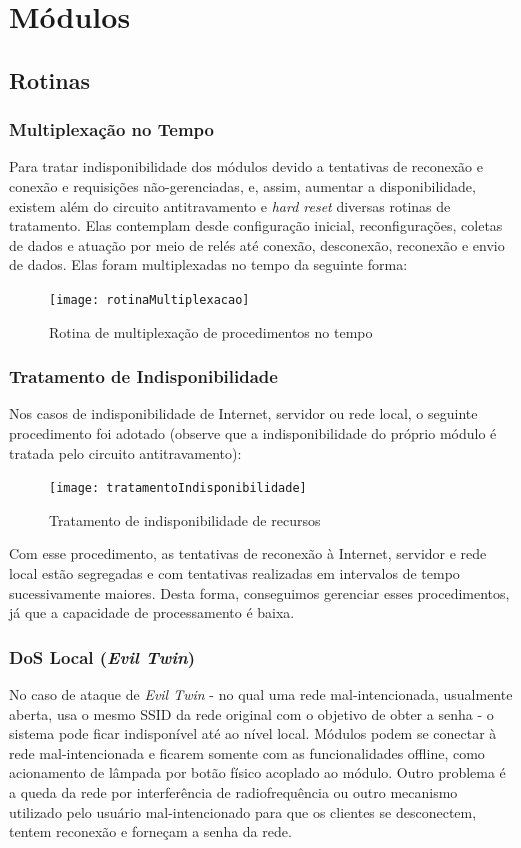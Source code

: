 \section{Módulos}
\subsection {Rotinas}
\subsubsection{Multiplexação no Tempo}
Para tratar indisponibilidade dos módulos devido a tentativas de reconexão e conexão e requisições não-gerenciadas, e, assim, aumentar a disponibilidade, existem além do circuito antitravamento e \textit{hard reset} diversas rotinas de tratamento. Elas contemplam desde configuração inicial, reconfigurações, coletas de dados e atuação por meio de relés até conexão, desconexão, reconexão e envio de dados. Elas foram multiplexadas no tempo da seguinte forma:

\begin{figure} [H]
	\centering
	\caption{Rotina de multiplexação de procedimentos no tempo}
  \texttt{[image: rotinaMultiplexacao]}
\label{fig:rotinaMultiplexacao}
\end{figure}

\subsubsection{Tratamento de Indisponibilidade}
Nos casos de indisponibilidade de Internet, servidor ou rede local, o seguinte procedimento foi adotado (observe que a indisponibilidade do próprio módulo é tratada pelo circuito antitravamento):

\begin{figure}[H]
	\centering
	\caption{Tratamento de indisponibilidade de recursos}
  \texttt{[image: tratamentoIndisponibilidade]}
\label{fig:tratamentoIndisponibilidade}
\end{figure}

Com esse procedimento, as tentativas de reconexão à Internet, servidor e rede local estão segregadas e com tentativas realizadas em intervalos de tempo sucessivamente maiores. Desta forma, conseguimos gerenciar esses procedimentos, já que a capacidade de processamento é baixa.

\subsubsection{DoS Local (\textit{Evil Twin})}
No caso de ataque de \textit{Evil Twin} - no qual uma rede mal-intencionada, usualmente aberta, usa o mesmo SSID da rede original com o objetivo de obter a senha - o sistema pode ficar indisponível até ao nível local. Módulos podem se conectar à rede mal-intencionada e ficarem somente com as funcionalidades offline, como acionamento de lâmpada por botão físico acoplado ao módulo. Outro problema é a queda da rede por interferência de radiofrequência ou outro mecanismo utilizado pelo usuário mal-intencionado para que os clientes se desconectem, tentem reconexão e forneçam a senha da rede.

